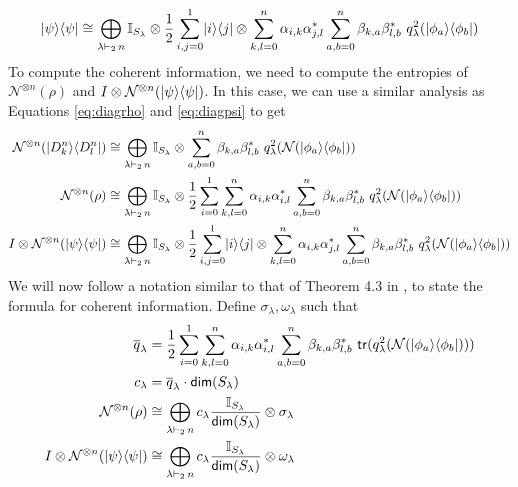 \documentclass[11pt]{article}
\DeclarePairedDelimiter\bra{\langle}{\rvert}
\DeclarePairedDelimiter\ket{\lvert}{\rangle}
\begin{document}
\begin{align}\label{eq:diagpsi}
    \ket{\psi}\bra{\psi} \cong \bigoplus_{\lambda \vdash_2\, n} \mathbb{I}_{S_{\lambda}} \otimes \frac{1}{2} \sum_{i, j = 0}^1 \ket{i}\bra{j} \otimes \sum_{k, l = 0}^{n} \alpha_{i, k}\alpha_{j, l}^\ast \sum_{a, b = 0}^{n} \beta_{k, a} \beta_{l, b}^\ast~q^2_{\lambda}(\ket{\phi_a}\bra{\phi_b})
\end{align}
To compute the coherent information, we need to compute the entropies of $\mathcal{N}^{\otimes n}(\rho)$ and $I \otimes \mathcal{N}^{\otimes n}(\ket{\psi}\bra{\psi})$. In this case, we can use a similar analysis as Equations \ref{eq:diagrho} and \ref{eq:diagpsi} to get
\begin{align*}
    \mathcal{N}^{\otimes n}(\ket{D_{k}^n}\bra{D_{l}^n}) &\cong \bigoplus_{\lambda \vdash_2\, n} \mathbb{I}_{S_{\lambda}} \otimes \sum_{a,b = 0}^{n} \beta_{k, a} \beta_{l, b}^\ast~q^2_{\lambda}(\mathcal{N}(\ket{\phi_a}\bra{\phi_b})) \\
    \mathcal{N}^{\otimes n}(\rho) &\cong \bigoplus_{\lambda \vdash_2\, n} \mathbb{I}_{S_{\lambda}} \otimes \frac{1}{2}\sum_{i=0}^1\sum_{k, l = 0}^{n} \alpha_{i, k}\alpha_{i, l}^{\ast} \sum_{a, b = 0}^{n} \beta_{k, a} \beta_{l, b}^\ast~q^2_{\lambda}(\mathcal{N}(\ket{\phi_a}\bra{\phi_b})) \\
    I \otimes \mathcal{N}^{\otimes n}(\ket{\psi}\bra{\psi}) &\cong \bigoplus_{\lambda \vdash_2\, n} \mathbb{I}_{S_{\lambda}} \otimes \frac{1}{2} \sum_{i, j = 0}^1 \ket{i}\bra{j} \otimes \sum_{k, l = 0}^{n} \alpha_{i, k}\alpha_{j, l}^\ast \sum_{a, b = 0}^{n} \beta_{k, a} \beta_{l, b}^\ast~q^2_{\lambda}(\mathcal{N}(\ket{\phi_a}\bra{\phi_b}))
\end{align*}
We will now follow a notation similar to that of Theorem 4.3 in \cite{bhalerao2025improvingquantumcommunicationrates}, to state the formula for coherent information. Define $\sigma_{\lambda}, \omega_{\lambda}$ such that
\begin{equation}\label{eq:params}
\begin{aligned}
   \overline{q}_{\lambda} &= \frac{1}{2} \sum_{i=0}^1\sum_{k, l = 0}^{n} \alpha_{i, k}\alpha_{i, l}^{\ast} \sum_{a, b = 0}^{n} \beta_{k, a} \beta_{l, b}^\ast~\mathsf{tr(}q^2_{\lambda}(\mathcal{N}(\ket{\phi_a}\bra{\phi_b}))) \\
   c_{\lambda} &= \overline{q}_{\lambda} \cdot \mathsf{dim}(S_{\lambda}) \\
   \mathcal{N}^{\otimes n}(\rho) &\cong \bigoplus_{\lambda \vdash_2\, n} c_{\lambda} \frac{\mathbb{I}_{S_{\lambda}}}{\mathsf{dim}(S_{\lambda})} \otimes \sigma_{\lambda} \\
   I \otimes \mathcal{N}^{\otimes n}(\ket{\psi}\bra{\psi}) &\cong \bigoplus_{\lambda \vdash_2\, n} c_{\lambda} \frac{\mathbb{I}_{S_{\lambda}}}{\mathsf{dim}(S_{\lambda})} \otimes \omega_{\lambda}
\end{aligned}
\end{equation}
\end{document}
